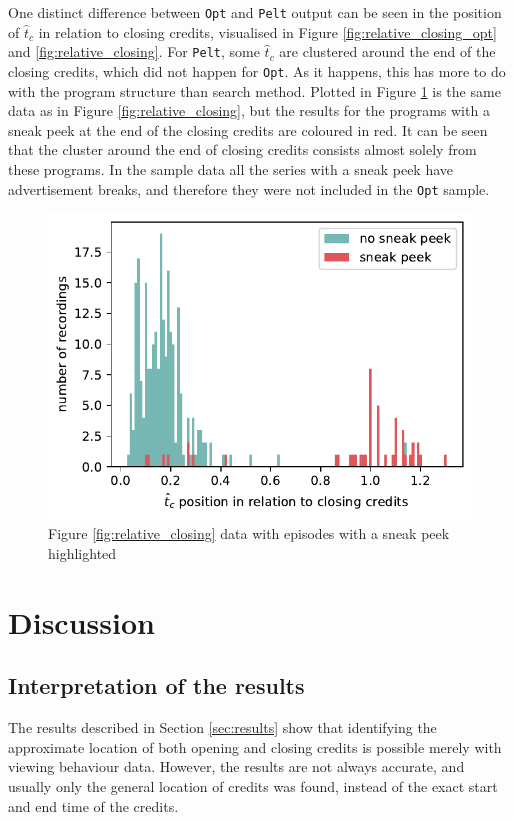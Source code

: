 One distinct difference between \texttt{Opt} and \texttt{Pelt} output can be seen in the position of $\hat{t}_c$ in relation to closing credits, visualised in Figure \ref{fig:relative_closing_opt} and \ref{fig:relative_closing}. For \texttt{Pelt}, some $\hat{t}_c$ are clustered around the end of the closing credits, which did not happen for \texttt{Opt}. As it happens, this has more to do with the program structure than search method. Plotted in Figure \ref{fig:relative_sneakpeek} is the same data as in Figure \ref{fig:relative_closing}, but the results for the programs with a sneak peek at the end of the closing credits are coloured in red. It can be seen that the cluster around the end of closing credits consists almost solely from these programs. In the sample data all the series with a sneak peek have advertisement breaks, and therefore they were not included in the \texttt{Opt} sample.

\begin{figure}[h]
  \centering
  \includegraphics[width=.8\textwidth]{../plots/distances/relative_closing_sneak_peek.pdf}
  \caption{Figure \ref{fig:relative_closing} data with episodes with a sneak peek highlighted}
  \label{fig:relative_sneakpeek}
\end{figure}

\newpage
\section{Discussion} \label{sec:discussion}

\subsection{Interpretation of the results}

The results described in Section \ref{sec:results} show that identifying the approximate location of both opening and closing credits is possible merely with viewing behaviour data. However, the results are not always accurate, and usually only the general location of credits was found, instead of the exact start and end time of the credits.

